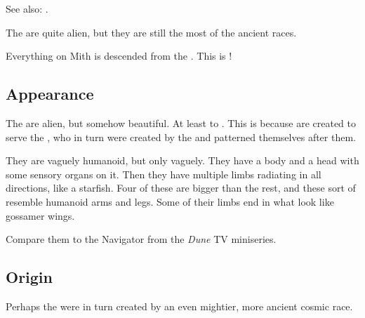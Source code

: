 See also: . 


The \voyagers{} are quite alien, but they are still the most \human{} of the ancient races. 


Everything on Mith is descended from the \voyagers. This is !










\subsection{Appearance}
The \voyagers{} are alien, but somehow beautiful. At least to \humans. This is because \humans{} are created to serve the \banes{}, who in turn were created by the \voyagers{} and patterned themselves after them.

They are vaguely humanoid, but only vaguely.
They have a body and a head with some sensory organs on it. Then they have multiple limbs radiating in all directions, like a starfish. Four of these are bigger than the rest, and these sort of resemble humanoid arms and legs. Some of their limbs end in what look like gossamer wings.

Compare them to the Navigator from the \emph{Dune} TV miniseries.









\subsection{Origin}
Perhaps the \voyagers{} were in turn created by an even mightier, more ancient cosmic race.

